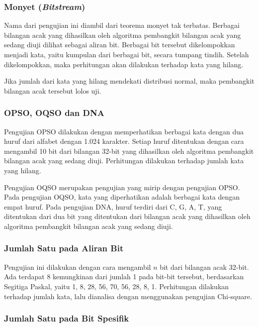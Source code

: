 \documentclass[conference]{IEEEtran}
\newcommand{\en}[1]
    {\foreignlanguage{english}{\textit{#1}}}
\begin{document}
\subsubsection{Monyet (\en{Bitstream})}

Nama dari pengujian ini diambil dari teorema monyet tak terbatas.
Berbagai bilangan acak yang dihasilkan oleh algoritma pembangkit bilangan acak yang sedang diuji dilihat sebagai aliran bit.
Berbagai bit tersebut dikelompokkan menjadi kata, yaitu kumpulan dari berbagai bit, secara tumpang tindih.
Setelah dikelompokkan, maka perhitungan akan dilakukan terhadap kata yang hilang.

Jika jumlah dari kata yang hilang mendekati distribusi normal, maka pembangkit bilangan acak tersebut lolos uji.

\subsubsection{OPSO, OQSO dan DNA}

Pengujian OPSO dilakukan dengan memperhatikan berbagai kata dengan dua huruf dari alfabet dengan 1.024 karakter.
Setiap huruf ditentukan dengan cara mengambil 10 bit dari bilangan 32-bit yang dihasilkan oleh algoritma pembangkit bilangan acak yang sedang diuji.
Perhitungan dilakukan terhadap jumlah kata yang hilang.

Pengujian OQSO merupakan pengujian yang mirip dengan pengujian OPSO.
Pada pengujian OQSO, kata yang diperhatikan adalah berbagai kata dengan empat huruf.
Pada pengujian DNA, huruf terdiri dari C, G, A, T, yang ditentukan dari dua bit yang ditentukan dari bilangan acak yang dihasilkan oleh algoritma pembangkit bilangan acak yang sedang diuji.

\subsubsection{Jumlah Satu pada Aliran Bit}
\label{sec:teori:diehard:count1stream}

Pengujian ini dilakukan dengan cara mengambil $n$ bit dari bilangan acak 32-bit.
Ada terdapat 8 kemungkinan dari jumlah 1 pada bit-bit tersebut, berdasarkan Segitiga Paskal, yaitu 1, 8, 28, 56, 70, 56, 28, 8, 1.
Perhitungan dilakukan terhadap jumlah kata, lalu dianalisa dengan menggunakan pengujian Chi-square.

\subsubsection{Jumlah Satu pada Bit Spesifik}
\end{document}
